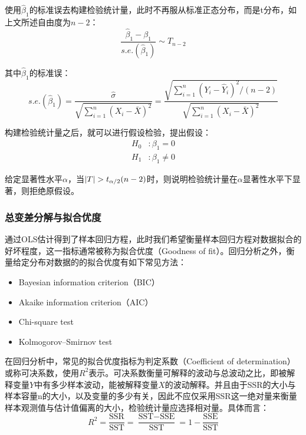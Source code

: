 \documentclass[11pt]{article}
\begin{document}
使用$\hat{\beta}_1$的标准误去构建检验统计量，此时不再服从标准正态分布，而是t分布，如上文所述自由度为$n-2$：
\begin{equation*}
    \frac{\hat{\beta}_1 - \beta_1}{s.e.(\hat{\beta}_1)} \sim T_{n-2}
\end{equation*}

其中$\hat{\beta}_1$的标准误：
\begin{equation*}
    s.e.(\hat{\beta}_1) 
    = \frac{\hat{\sigma}}{\sqrt{\sum_{i=1}^{n} \left(X_i - \bar{X}\right)^2}}
    = \frac{\sqrt{\sum_{i=1}^{n} (Y_i - \hat{Y}_i)^2 / (n-2)}}{\sqrt{\sum_{i=1}^{n} (X_i - \bar{X})^2}}
\end{equation*}

构建检验统计量之后，就可以进行假设检验，提出假设：
\begin{align*}
    H_0&: \beta_1 = 0 \\
    H_1&: \beta_1 \neq 0
\end{align*}

给定显著性水平$\alpha$，当$\left\lvert T\right\rvert > t_{\alpha/2}(n-2)$时，则说明检验统计量在$\alpha$显著性水平下显著，则拒绝原假设。

\subsubsection{总变差分解与拟合优度}

通过OLS估计得到了样本回归方程，此时我们希望衡量样本回归方程对数据拟合的好坏程度，这一指标通常被称为拟合优度（Goodness of fit）。回归分析之外，衡量给定分布对数据的的拟合优度有如下常见方法：
\begin{itemize}
    \item Bayesian information criterion（BIC）
    \item Akaike information criterion（AIC）
    \item Chi-square test
    \item Kolmogorov–Smirnov test
\end{itemize}

在回归分析中，常见的拟合优度指标为判定系数（Coefficient of determination）或称可决系数，使用$R^2$表示。可决系数衡量可解释的波动与总波动之比，即被解释变量$Y$中有多少样本波动，能被解释变量$X$的波动解释。并且由于SSR的大小与样本容量n的大小，以及变量的多少有关，因此不应仅采用SSR这一绝对量来衡量样本观测值与估计值偏离的大小，检验统计量应选择相对量。具体而言：
\begin{equation*}
    R^2 = \frac{\text{SSR}}{\text{SST}} = \frac{\text{SST}-\text{SSE}}{\text{SST}} = 1 - \frac{\text{SSE}}{\text{SST}}
\end{equation*}
\end{document}
